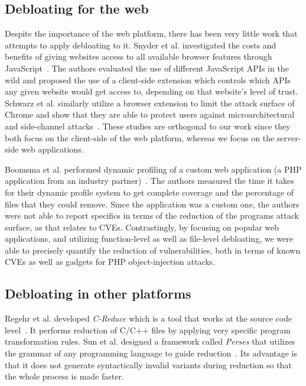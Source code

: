 \subsection{Debloating for the web}

Despite the importance of the web platform, there has been very little work that attempts to apply debloating to it. Snyder et al. investigated the costs and
benefits of giving websites access to all available browser features through
JavaScript~\cite{snyder2017vibrate}. The authors evaluated the use of different
JavaScript APIs in the wild and proposed the use of a client-side extension
which controls which APIs any given website would get access to, depending
on that website's level of trust. Schwarz et al. similarly utilize a browser
extension to limit the attack surface of Chrome and show that they are able
to protect users against microarchitectural and side-channel
attacks~\cite{Schwarz2018}. These studies are orthogonal to our work since
they both focus on the client-side of the web platform, whereas we focus on
the server-side web applications.


Boomsma et al. performed dynamic profiling of a custom web application
(a PHP application from an industry partner)~\cite{boomsma2012Dead}. The
authors measured the time it takes for their dynamic profile system to get
complete coverage and the percentage of files that they could remove. Since the
application was a custom one, the authors were not able to report specifics
in terms of the reduction of the programs attack surface, as that relates
to CVEs. Contrastingly, by focusing on popular web applications, and utilizing function-level as well as file-level debloating, we were
able to precisely quantify the reduction of vulnerabilities, both in terms
of known CVEs as well as gadgets for PHP object-injection attacks.


\subsection{Debloating in other platforms}

Regehr et al. developed \textit{C-Reduce} which is a tool that works at the source code level~\cite{regehr2012CReduce}.
It performs reduction of C/C++ files by applying very specific program transformation rules.
Sun et al. designed a framework called \textit{Perses} that utilizes the grammar of any programming language to guide reduction~\cite{sun2018perses}.
Its advantage is that it does not generate syntactically invalid variants during reduction so that the whole process is made faster.


